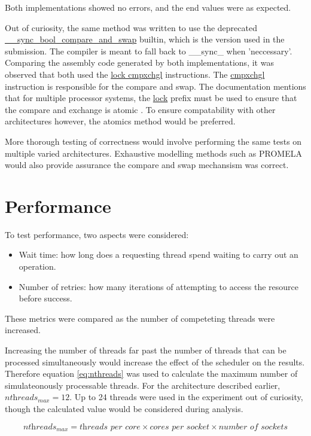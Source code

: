 \documentclass[12pt]{article}
\begin{document}
Both implementations showed no errors, and the end values were as expected. 

Out of curiosity, the same method was written to use the deprecated \url{__sync_bool_compare_and_swap} builtin, which is the version used in the submission. The compiler is meant to fall back to \_\_sync\_ when 'neccessary'. Comparing the assembly code generated by both implementations, it was observed that both used the \url{lock cmpxchgl} instructions. The \url{cmpxchgl} instruction is responsible for the compare and swap. The documentation mentions that for multiple processor systems, the \url{lock} prefix must be used to ensure that the compare and exchange is atomic \cite{intelAtomic}. To ensure compatability with other architectures however, the atomics method would be preferred.

More thorough testing of correctness would involve performing the same tests on multiple varied architectures. Exhaustive modelling methods such as PROMELA would also provide assurance the compare and swap mechansism was correct.

\section{Performance}

To test performance, two aspects were considered:

\begin{itemize}
\item Wait time: how long does a requesting thread spend waiting to carry out an operation.
\item Number of retries: how many iterations of attempting to access the resource before success.
\end{itemize}

\noindent These metrics were compared as the number of competeting threads were increased.

Increasing the number of threads far past the number of threads that can be processed simultaneously would increase the effect of the scheduler on the results. Therefore equation \ref{eq:nthreads} was used to calculate the maximum number of simulateonously processable threads. For the architecture described earlier, $\textit{nthreads}_\textit{max} = 12 $. Up to 24 threads were used in the experiment out of curiosity, though the calculated value would be considered during analysis.

\begin{equation}
\label{eq:nthreads}
	\textit{nthreads}_\textit{max} =
	 \textit{threads per core} \times \textit{cores per socket} \times \textit{number of sockets}
\end{equation}
\end{document}
